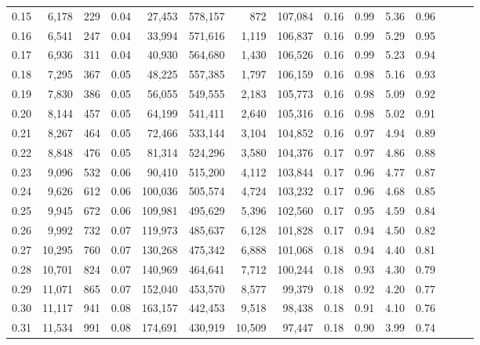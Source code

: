 \begin{tabular}{rrrrrrrrrrrrrrr}
0.15 &   6,178 &    229 &  0.04 &   27,453 &  578,157 &      872 &  107,084 &  0.16 &  0.99 &  5.36 &      0.96 \\
0.16 &   6,541 &    247 &  0.04 &   33,994 &  571,616 &    1,119 &  106,837 &  0.16 &  0.99 &  5.29 &      0.95 \\
0.17 &   6,936 &    311 &  0.04 &   40,930 &  564,680 &    1,430 &  106,526 &  0.16 &  0.99 &  5.23 &      0.94 \\
0.18 &   7,295 &    367 &  0.05 &   48,225 &  557,385 &    1,797 &  106,159 &  0.16 &  0.98 &  5.16 &      0.93 \\
0.19 &   7,830 &    386 &  0.05 &   56,055 &  549,555 &    2,183 &  105,773 &  0.16 &  0.98 &  5.09 &      0.92 \\
0.20 &   8,144 &    457 &  0.05 &   64,199 &  541,411 &    2,640 &  105,316 &  0.16 &  0.98 &  5.02 &      0.91 \\
0.21 &   8,267 &    464 &  0.05 &   72,466 &  533,144 &    3,104 &  104,852 &  0.16 &  0.97 &  4.94 &      0.89 \\
0.22 &   8,848 &    476 &  0.05 &   81,314 &  524,296 &    3,580 &  104,376 &  0.17 &  0.97 &  4.86 &      0.88 \\
0.23 &   9,096 &    532 &  0.06 &   90,410 &  515,200 &    4,112 &  103,844 &  0.17 &  0.96 &  4.77 &      0.87 \\
0.24 &   9,626 &    612 &  0.06 &  100,036 &  505,574 &    4,724 &  103,232 &  0.17 &  0.96 &  4.68 &      0.85 \\
0.25 &   9,945 &    672 &  0.06 &  109,981 &  495,629 &    5,396 &  102,560 &  0.17 &  0.95 &  4.59 &      0.84 \\
0.26 &   9,992 &    732 &  0.07 &  119,973 &  485,637 &    6,128 &  101,828 &  0.17 &  0.94 &  4.50 &      0.82 \\
0.27 &  10,295 &    760 &  0.07 &  130,268 &  475,342 &    6,888 &  101,068 &  0.18 &  0.94 &  4.40 &      0.81 \\
0.28 &  10,701 &    824 &  0.07 &  140,969 &  464,641 &    7,712 &  100,244 &  0.18 &  0.93 &  4.30 &      0.79 \\
0.29 &  11,071 &    865 &  0.07 &  152,040 &  453,570 &    8,577 &   99,379 &  0.18 &  0.92 &  4.20 &      0.77 \\
0.30 &  11,117 &    941 &  0.08 &  163,157 &  442,453 &    9,518 &   98,438 &  0.18 &  0.91 &  4.10 &      0.76 \\
0.31 &  11,534 &    991 &  0.08 &  174,691 &  430,919 &   10,509 &   97,447 &  0.18 &  0.90 &  3.99 &      0.74 \\

\end{tabular}
